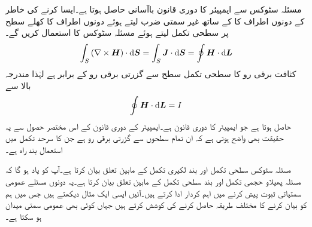 مسئلہ سٹوکس سے ایمپیئر کا دوری قانون باآسانی حاصل ہوتا ہے۔ایسا کرنے کی خاطر   کے دونوں اطراف کا  کے ساتھ غیر سمتی ضرب لیتے ہوئے دونوں اطراف کا کھلے سطح  پر سطحی تکمل لیتے  ہوئے مسئلہ سٹوکس کا استعمال کریں گے۔ 
\begin{align*}
\int_S \left(\nabla \times \kvec{H} \right) \cdot \dif \kvec{S}=\int_S \kvec{J} \cdot \dif \kvec{S}=\oint \kvec{H} \cdot \dif \kvec{L}
\end{align*}
کثافت برقی رو کا سطحی تکمل سطح  سے گزرتی برقی رو کے برابر ہے لہٰذا مندرجہ بالا سے
\begin{align*}
\oint \kvec{H} \cdot \dif \kvec{L}=I
\end{align*}
حاصل ہوتا ہے جو ایمپیئر کا دوری قانون ہے۔ایمپیئر کے دوری قانون کے اس مختصر حصول سے یہ حقیقت بھی واضح ہوتی ہے کہ  ان تمام سطحوں سے گزرتی برقی رو ہے جن کا سرحد تکمل میں استعمال بند راہ ہے۔

مسئلہ سٹوکس  سطحی تکمل  اور بند لکیری تکمل کے مابین تعلق بیان کرتا ہے۔آپ کو یاد ہو گا کہ مسئلہ پھیلاو حجمی تکمل اور بند سطحی تکمل کے مابین تعلق بیان کرتا ہے۔یہ دونوں مسئلے عمومی سمتیاتی ثبوت پیش کرنے میں اہم کردار ادا کرتے ہیں۔آئیں ایسی ایک مثال دیکھتے ہیں جس میں ہم  کو بیان کرنے  کا مختلف طریقہ حاصل کرنے کی کوشش کرتے ہیں  جہاں  کوئی بھی عمومی سمتی میدان ہو سکتا ہے۔


